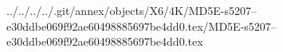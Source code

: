 ../../../../.git/annex/objects/X6/4K/MD5E-s5207--e30ddbe069f92ae60498885697be4dd0.tex/MD5E-s5207--e30ddbe069f92ae60498885697be4dd0.tex